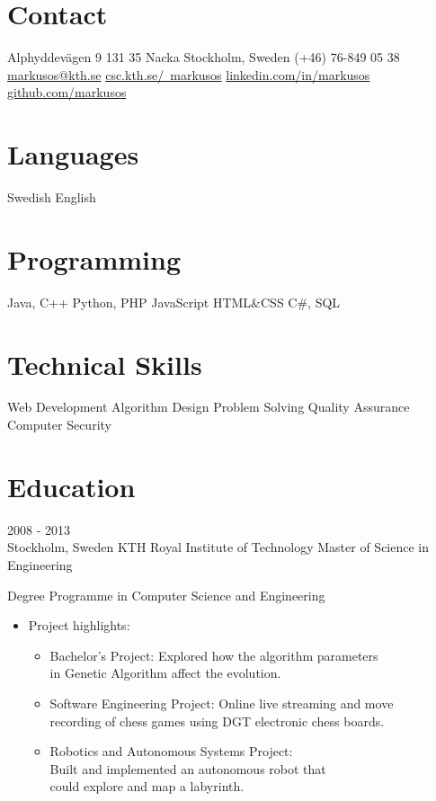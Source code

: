 \documentclass{markusos-cv}
\begin{document}


\begin{aside}
\section{Contact}
Alphyddevägen 9
131 35 Nacka
Stockholm, Sweden
(+46) 76-849 05 38
~
\href{mailto:markusos@kth.se}{markusos@kth.se}
\href{http://www.csc.kth.se/~markusos}{csc.kth.se/~markusos}
\href{http://www.linkedin.com/in/markusos}{linkedin.com/in/markusos}
\href{https://github.com/markusos}{github.com/markusos}
\section{Languages}
Swedish
English
\section{Programming}
Java, C++
Python, PHP
JavaScript
HTML\&CSS
C\#, SQL
\section{Technical Skills}
Web Development
Algorithm Design
Problem Solving
Quality Assurance
Computer Security
\end{aside}


\section{Education}

\begin{entrylist}
\entry
{2008 - 2013 \\}
{Stockholm, Sweden}
{KTH Royal Institute of Technology}
{Master of Science in Engineering}
{
Degree Programme in Computer Science and Engineering
\begin{itemize}
	\item Project highlights: 
	\begin{itemize}
		\item Bachelor’s Project: Explored how the algorithm parameters\\ in Genetic Algorithm affect the evolution.
		\item Software Engineering Project: Online live streaming and move\\ recording of chess games using DGT electronic chess boards. 
		\item Robotics and Autonomous Systems Project:\\ Built and implemented an autonomous robot that\\ could explore and map a labyrinth.
	\end{itemize}
\end{itemize}
}
\end{entrylist}
\end{document}
